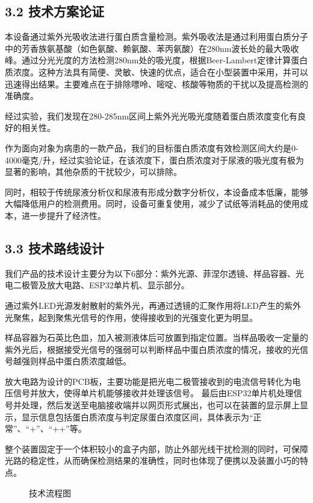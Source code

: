 \documentclass[a4paper,12pt]{article}
\begin{document}
\subsection*{3.2 技术方案论证}
本设备通过紫外光吸收法进行蛋白质含量检测。紫外吸收法是通过利用蛋白质分子中的芳香族氨基酸（如色氨酸、赖氨酸、苯丙氨酸）在280nm波长处的最大吸收峰。通过分光光度的方法检测280nm处的吸光度，根据Beer-Lambert定律计算蛋白质浓度。这种方法具有简便、灵敏、快速的优点，适合在小型装置中采用，并可以迅速得出结果。主要难点在于排除嘌呤、嘧啶、核酸等物质的干扰以及提高检测的准确度。

经过实验，我们发现在280-285nm区间上紫外光光吸光度随着蛋白质浓度变化有良好的相关性。

作为面向对象为病患的一款产品，我们的目标蛋白质浓度有效检测区间大约是0-4000毫克/升，经过实验论证，在该浓度下，蛋白质浓度对于尿液的吸光度有极为显著的影响，其他杂质的干扰较少，可以排除。

同时，相较于传统尿液分析仪和尿液有形成分数字分析仪，本设备成本低廉，能够大幅降低用户的检测费用。同时，设备可重复使用，减少了试纸等消耗品的使用成本，进一步提升了经济性。

\subsection*{3.3 技术路线设计}
我们产品的技术设计主要分为以下6部分：紫外光源、菲涅尔透镜、样品容器、光电二极管及放大电路、ESP32单片机、显示部分。

通过紫外LED光源发射散射的紫外光，再通过透镜的汇聚作用将LED产生的紫外光聚焦，起到聚焦光信号的作用，使得接收到的光强变化更为明显。

样品容器为石英比色皿，加入被测液体后可放置到指定位置。当样品吸收一定量的紫外光后，根据接受光信号的强弱可以判断样品中蛋白质浓度的情况，接收的光信号越强则样品中蛋白质浓度越低。

放大电路为设计的PCB板，主要功能是把光电二极管接收到的电流信号转化为电压信号并放大，使得单片机能够接收并处理该信号。
最后由ESP32单片机处理信号并处理，然后发送至电脑接收端并以网页形式展出，也可以在装置的显示屏上显示，显示信息包括蛋白质浓度与判定尿蛋白浓度区间，具体表示为“正常”、“+”、“++”等。

整个装置固定于一个体积较小的盒子内部，防止外部光线干扰检测的同时，可保障光路的稳定性，从而确保检测结果的准确性，同时也体现了便携以及装置小巧的特点。

\begin{figure}[H]
    \centering
    \caption{技术流程图}
\end{figure}
\end{document}
